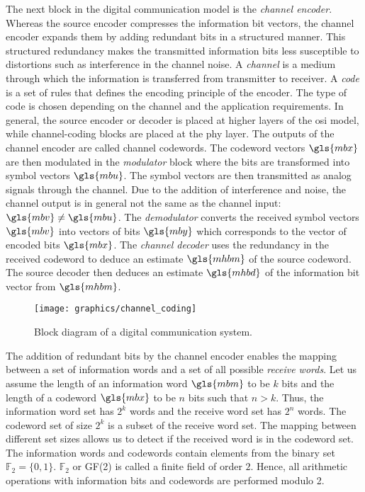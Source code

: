 The next block in the digital communication model is the \emph{channel encoder}. Whereas the source encoder compresses the information bit vectors, the channel encoder expands them by adding redundant bits in a structured manner. This structured redundancy makes the transmitted information bits less susceptible to distortions such as interference in the channel noise. A \emph{channel} is a medium through which the information is transferred from transmitter to receiver. A \emph{code} is a set of rules that defines the encoding principle of the encoder. The type of code is chosen depending on the channel and the application requirements. In general, the source encoder or decoder is placed at higher layers of the \gls{osi} model, while channel-coding blocks are placed at the \gls{phy} layer. The outputs of the channel encoder are called channel codewords. The codeword vectors $\gls{mbx}$ are then modulated in the \emph{modulator} block where the bits are transformed into symbol vectors $\gls{mbu}$. The symbol vectors are then transmitted as analog signals through the channel. Due to the addition of interference and noise, the channel output is in general not the same as the channel input: $\gls{mbv}\neq\gls{mbu}$. The \emph{demodulator} converts the received symbol vectors $\gls{mbv}$ into vectors of bits $\gls{mby}$ which corresponds to the vector of encoded bits $\gls{mbx}$. The \emph{channel decoder} uses the redundancy in the received codeword to deduce an estimate $\gls{mhbm}$ of the source codeword. The source decoder then deduces an estimate $\gls{mhbd}$ of the information bit vector from $\gls{mhbm}$.

\begin{figure}[htbp]
  \centering
  \texttt{[image: graphics/channel\_coding]}
  \caption{Block diagram of a digital communication system.}
  \label{fig:chanCoding}
\end{figure}

The addition of redundant bits by the channel encoder enables the mapping between a set of information words and a set of all possible \emph{receive words}. Let us assume the length of an information word $\gls{mbm}$ to be $k$ bits and the length of a codeword $\gls{mbx}$ to be $n$ bits such that $n>k$. Thus, the information word set has $2^k$ words and the receive word set has $2^n$ words. The codeword set of size $2^k$ is a subset of the receive word set. The mapping between different set sizes allows us to detect if the received word is in the codeword set. The information words and codewords contain elements from the binary set $\mathbb{F}_2=\{0,1\}$. $\mathbb{F}_2$ or GF(2) is called a finite field of order $2$. Hence, all arithmetic operations with information bits and codewords are performed modulo 2.

